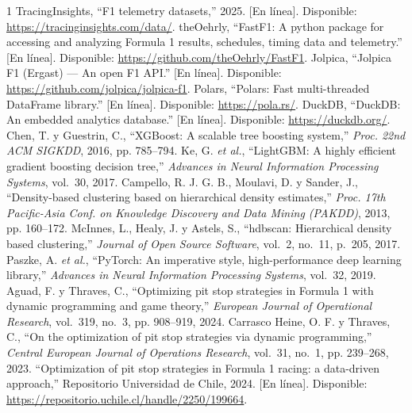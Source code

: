 \documentclass[conference]{IEEEtran}
\begin{document}
\begin{thebibliography}{1}
TracingInsights, ``F1 telemetry datasets,'' 2025. [En línea]. Disponible:
\url{https://tracinginsights.com/data/}.
theOehrly, ``FastF1: A python package for accessing and analyzing Formula 1
results, schedules, timing data and telemetry.'' [En línea]. Disponible:
\url{https://github.com/theOehrly/FastF1}.
Jolpica, ``Jolpica F1 (Ergast) — An open F1 API.'' [En línea]. Disponible:
\url{https://github.com/jolpica/jolpica-f1}.
Polars, ``Polars: Fast multi-threaded DataFrame library.'' [En línea].
Disponible: \url{https://pola.rs/}.
DuckDB, ``DuckDB: An embedded analytics database.'' [En línea]. Disponible:
\url{https://duckdb.org/}.
Chen, T. y Guestrin, C., ``XGBoost: A scalable tree boosting system,''
\textit{Proc. 22nd ACM SIGKDD}, 2016, pp. 785–794.
Ke, G. \textit{et al.}, ``LightGBM: A highly efficient gradient boosting
decision tree,''
\textit{Advances in Neural Information Processing Systems}, vol.~30, 2017.
Campello, R. J. G. B., Moulavi, D. y Sander, J., ``Density-based clustering
based on hierarchical density estimates,''
\textit{Proc. 17th Pacific-Asia Conf. on Knowledge Discovery and Data
Mining (PAKDD)}, 2013, pp. 160–172.
McInnes, L., Healy, J. y Astels, S., ``hdbscan: Hierarchical density based
clustering,'' \textit{Journal of Open Source Software}, vol.~2, no.~11,
p.~205, 2017.
Paszke, A. \textit{et al.}, ``PyTorch: An imperative style, high-performance
deep learning library,''
\textit{Advances in Neural Information Processing Systems}, vol.~32, 2019.
Aguad, F. y Thraves, C., ``Optimizing pit stop strategies in Formula 1 with
dynamic programming and game theory,'' \textit{European Journal of
Operational Research}, vol.~319, no.~3, pp. 908–919, 2024.
Carrasco Heine, O. F. y Thraves, C., ``On the optimization of pit stop
strategies via dynamic programming,'' \textit{Central European Journal of
Operations Research}, vol.~31, no.~1, pp. 239–268, 2023.
``Optimization of pit stop strategies in Formula 1 racing: a data-driven
approach,'' Repositorio Universidad de Chile, 2024. [En línea]. Disponible:
\url{https://repositorio.uchile.cl/handle/2250/199664}.

\end{thebibliography}
\end{document}
